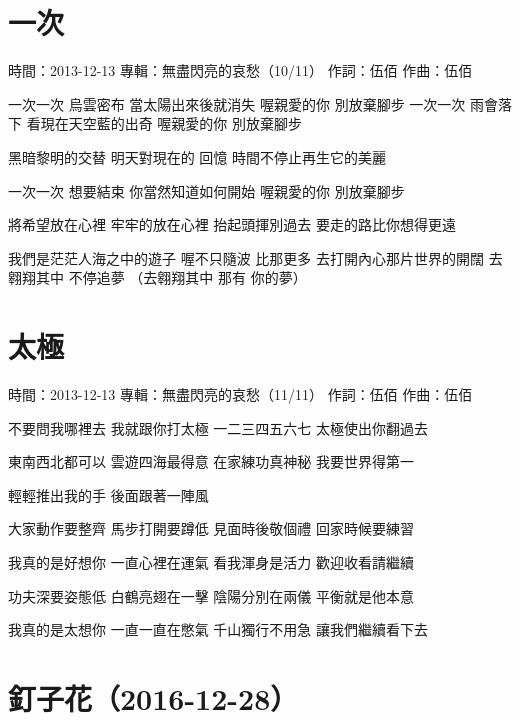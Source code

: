 \documentclass[UTF8,a4paper,oneside,twocolumn,12pt]{ctexbook}
\newcommand{\infopair}[2]{\textbullet #1：#2}
\newcommand{\zc}[1][伍佰]{\infopair{作詞}{#1}}
\newcommand{\zq}[1][伍佰]{\infopair{作曲}{#1}}
\newcommand{\zj}[1]{\infopair{專輯}{#1}}
\newcommand{\sj}[1]{\infopair{時間}{#1}}
\newenvironment{info}{\begin{flushleft}\kaishu
	}
	{\end{flushleft}\normalsize\yahei\par}
\newenvironment{lyric}{
	}
{}
\begin{document}
\section{一次}
\begin{info}
	\sj{2013-12-13}
	\zj{無盡閃亮的哀愁（10/11）}
	\zc
	\zq
\end{info}
\begin{lyric}
	一次一次 烏雲密布 當太陽出來後就消失
	喔親愛的你 別放棄腳步
	一次一次 雨會落下 看現在天空藍的出奇
	喔親愛的你 別放棄腳步

	黑暗黎明的交替 明天對現在的 回憶
	時間不停止再生它的美麗

	一次一次 想要結束 你當然知道如何開始
	喔親愛的你 別放棄腳步

	將希望放在心裡 牢牢的放在心裡
	抬起頭揮別過去 要走的路比你想得更遠

	我們是茫茫人海之中的遊子
	喔不只隨波 比那更多
	去打開內心那片世界的開闊
	去翱翔其中 不停追夢
	（去翱翔其中 那有 你的夢）
\end{lyric}

\section{太極}
\begin{info}
	\sj{2013-12-13}
	\zj{無盡閃亮的哀愁（11/11）}
	\zc
	\zq
\end{info}
\begin{lyric}
	不要問我哪裡去 我就跟你打太極
	一二三四五六七 太極使出你翻過去

	東南西北都可以 雲遊四海最得意
	在家練功真神秘 我要世界得第一

	輕輕推出我的手 後面跟著一陣風

	大家動作要整齊 馬步打開要蹲低
	見面時後敬個禮 回家時候要練習

	我真的是好想你 一直心裡在運氣
	看我渾身是活力 歡迎收看請繼續

	功夫深要姿態低 白鶴亮翅在一擊
	陰陽分別在兩儀 平衡就是他本意

	我真的是太想你 一直一直在憋氣
	千山獨行不用急 讓我們繼續看下去
\end{lyric}

\section*{釘子花（2016-12-28）}
\end{document}
